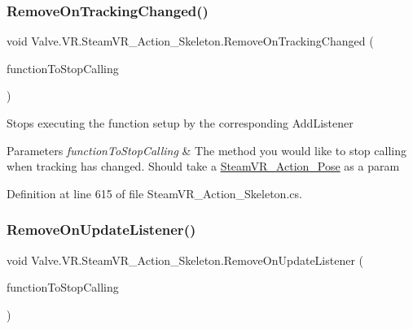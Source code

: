 \subsubsection{\texorpdfstring{RemoveOnTrackingChanged()}{RemoveOnTrackingChanged()}}
{\footnotesize\ttfamily void Valve.\+V\+R.\+Steam\+V\+R\+\_\+\+Action\+\_\+\+Skeleton.\+Remove\+On\+Tracking\+Changed (\begin{DoxyParamCaption}\item[{\mbox{\hyperlink{class_valve_1_1_v_r_1_1_steam_v_r___action___skeleton_a460bcda41aa359ec14435212bed2b856}{Tracking\+Change\+Handler}}}]{function\+To\+Stop\+Calling }\end{DoxyParamCaption})}



Stops executing the function setup by the corresponding Add\+Listener 


\begin{DoxyParams}{Parameters}
{\em function\+To\+Stop\+Calling} & The method you would like to stop calling when tracking has changed. Should take a \mbox{\hyperlink{class_valve_1_1_v_r_1_1_steam_v_r___action___pose}{Steam\+V\+R\+\_\+\+Action\+\_\+\+Pose}} as a param\\
\hline
\end{DoxyParams}


Definition at line 615 of file Steam\+V\+R\+\_\+\+Action\+\_\+\+Skeleton.\+cs.

\mbox{\label{class_valve_1_1_v_r_1_1_steam_v_r___action___skeleton_ae663ccb6de66ea17fa2e21a8c02e78eb}} 
\subsubsection{\texorpdfstring{RemoveOnUpdateListener()}{RemoveOnUpdateListener()}}
{\footnotesize\ttfamily void Valve.\+V\+R.\+Steam\+V\+R\+\_\+\+Action\+\_\+\+Skeleton.\+Remove\+On\+Update\+Listener (\begin{DoxyParamCaption}\item[{\mbox{\hyperlink{class_valve_1_1_v_r_1_1_steam_v_r___action___skeleton_a9fd666c2f3ccefc435275d85c525337c}{Update\+Handler}}}]{function\+To\+Stop\+Calling }\end{DoxyParamCaption})}



